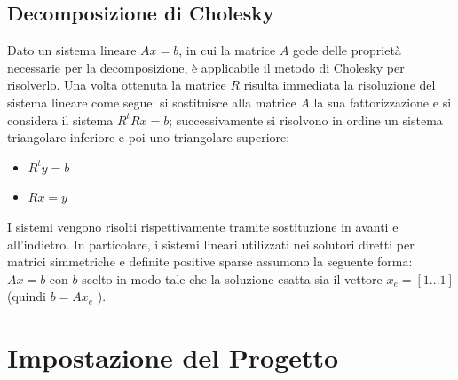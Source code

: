 \documentclass[a4paper,12pt,titlepage,oneside]{book}
\begin{document}
\section{Decomposizione di Cholesky}
Dato un sistema lineare $Ax = b$, in cui la matrice $A$ gode delle proprietà necessarie per la decomposizione, è applicabile il metodo di Cholesky per risolverlo. Una volta ottenuta la matrice $R$ risulta immediata la risoluzione del sistema lineare come segue: si sostituisce alla matrice $A$ la sua fattorizzazione e si considera il sistema $R^tRx = b$; successivamente si risolvono in ordine un sistema triangolare inferiore e poi uno triangolare superiore:
\begin{itemize}
  \item $R^t y = b$
  \item $Rx = y$
\end{itemize}

I sistemi vengono risolti rispettivamente tramite sostituzione in avanti e all’indietro. In particolare, i sistemi lineari utilizzati nei solutori diretti per matrici simmetriche e definite positive sparse assumono la seguente forma: $Ax = b$ con $b$ scelto in modo tale che la soluzione esatta sia il vettore $x_e = [1 . . . 1]$ (quindi $b = Ax_e$ ).


\chapter{Impostazione del Progetto}
\end{document}
